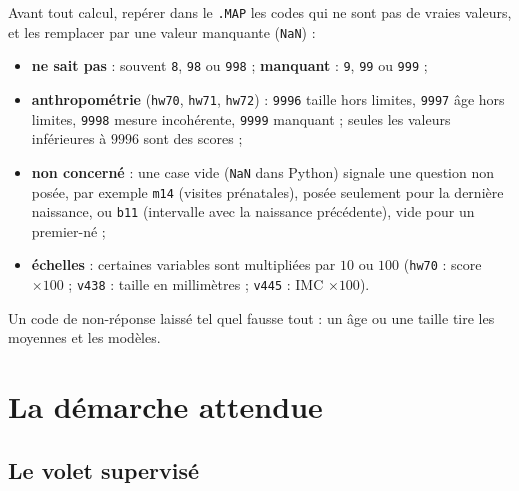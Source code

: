 \documentclass[11pt]{article}
\begin{document}
Avant tout calcul, repérer dans le \texttt{.MAP} les codes qui ne sont pas de vraies valeurs, et les remplacer par une valeur manquante (\texttt{NaN}) :
\begin{itemize}
  \item \textbf{ne sait pas} : souvent \texttt{8}, \texttt{98} ou \texttt{998} ; \textbf{manquant} : \texttt{9}, \texttt{99} ou \texttt{999} ;
  \item \textbf{anthropométrie} (\texttt{hw70}, \texttt{hw71}, \texttt{hw72}) : \texttt{9996} taille hors limites, \texttt{9997} âge hors limites, \texttt{9998} mesure incohérente, \texttt{9999} manquant ; seules les valeurs inférieures à $9996$ sont des scores ;
  \item \textbf{non concerné} : une case vide (\texttt{NaN} dans Python) signale une question non posée, par exemple \texttt{m14} (visites prénatales), posée seulement pour la dernière naissance, ou \texttt{b11} (intervalle avec la naissance précédente), vide pour un premier-né ;
  \item \textbf{échelles} : certaines variables sont multipliées par $10$ ou $100$ (\texttt{hw70} : score $\times100$ ; \texttt{v438} : taille en millimètres ; \texttt{v445} : IMC $\times100$).
\end{itemize}
Un code de non-réponse laissé tel quel fausse tout : un âge  \fg{} ou une taille  \fg{} tire les moyennes et les modèles.

\section{La démarche attendue}
\label{sec:demarche}

\subsection{Le volet supervisé}
\end{document}
